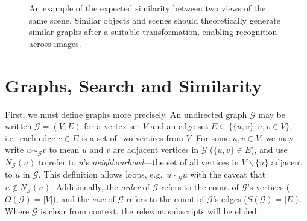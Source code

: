 \documentclass{mpaper}
\begin{document}
\begin{figure}
{
}
\caption{An example of the expected similarity between two views of the same scene. Similar objects and scenes should theoretically generate similar graphs after a suitable transformation, enabling recognition across images.\label{fig:intro-sim}}
\end{figure}

\section{Graphs, Search and Similarity}
\label{sec:graph-search}

First, we must define graphs more precisely.
An undirected graph $\mathcal{G}$ may be written $\mathcal{G} = (V,E)$ for a vertex set $V$ and an edge set $E \subseteq \lbrace \lbrace u,v \rbrace : u,v \in V \rbrace $, i.e.\ each edge $e \in E$ is a set of two vertices from $V$.
For some $u,v \in V$, we may write $u \sim_\mathcal{G} v$ to mean $u$ and $v$ are adjacent vertices in $\mathcal{G}$ ($\lbrace u,v \rbrace \in E$), and use $N_\mathcal{G}(u)$ to refer to $u$'s \emph{neighbourhood}---the set of all vertices in $V \backslash \lbrace u \rbrace$ adjacent to $u$ in $\mathcal{G}$.
This definition allows loops, e.g.\ $u \sim_\mathcal{G} u$ with the caveat that $u \notin N_\mathcal{G}(u)$.
Additionally, the \emph{order} of $\mathcal{G}$ refers to the count of $\mathcal{G}$'s vertices ($O(\mathcal{G})=|V|$), and the \emph{size} of $\mathcal{G}$ refers to the count of $\mathcal{G}$'s edges ($S(\mathcal{G})=|E|$).
Where $\mathcal{G}$ is clear from context, the relevant subscripts will be elided.
\end{document}
